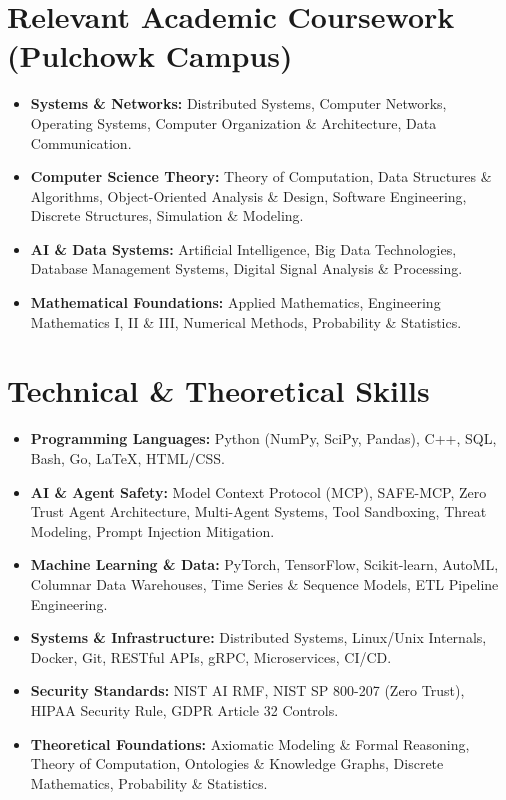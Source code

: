 \documentclass[10pt,letterpaper]{article}
\begin{document}
\section{Relevant Academic Coursework (Pulchowk Campus)}
\begin{itemize}[leftmargin=*,itemsep=1.5pt,topsep=1pt]
  \item \textbf{Systems \& Networks:} Distributed Systems, Computer Networks, Operating Systems, Computer Organization \& Architecture, Data Communication.
  \item \textbf{Computer Science Theory:} Theory of Computation, Data Structures \& Algorithms, Object-Oriented Analysis \& Design, Software Engineering, Discrete Structures, Simulation \& Modeling.
  \item \textbf{AI \& Data Systems:} Artificial Intelligence, Big Data Technologies, Database Management Systems, Digital Signal Analysis \& Processing.
  \item \textbf{Mathematical Foundations:} Applied Mathematics, Engineering Mathematics I, II \& III, Numerical Methods, Probability \& Statistics.
\end{itemize}

\section{Technical \& Theoretical Skills}
\begin{itemize}[leftmargin=*,itemsep=1.5pt,topsep=1pt]
  \item \textbf{Programming Languages:} Python (NumPy, SciPy, Pandas), C++, SQL, Bash, Go, LaTeX, HTML/CSS.
  \item \textbf{AI \& Agent Safety:} Model Context Protocol (MCP), SAFE-MCP, Zero Trust Agent Architecture, Multi-Agent Systems, Tool Sandboxing, Threat Modeling, Prompt Injection Mitigation.
  \item \textbf{Machine Learning \& Data:} PyTorch, TensorFlow, Scikit-learn, AutoML, Columnar Data Warehouses, Time Series \& Sequence Models, ETL Pipeline Engineering.
  \item \textbf{Systems \& Infrastructure:} Distributed Systems, Linux/Unix Internals, Docker, Git, RESTful APIs, gRPC, Microservices, CI/CD.
  \item \textbf{Security Standards:} NIST AI RMF, NIST SP 800-207 (Zero Trust), HIPAA Security Rule, GDPR Article 32 Controls.
  \item \textbf{Theoretical Foundations:} Axiomatic Modeling \& Formal Reasoning, Theory of Computation, Ontologies \& Knowledge Graphs, Discrete Mathematics, Probability \& Statistics.
\end{itemize}
\end{document}
